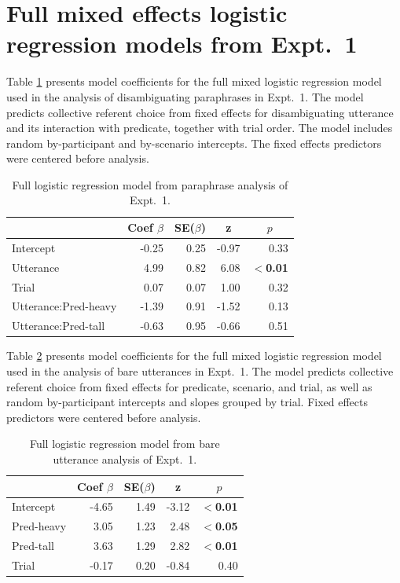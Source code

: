 \documentclass[linguex]{sp}
\begin{document}
\appendix

\section{Full mixed effects logistic regression models from Expt.~1}\label{expt1results}


Table \ref{expt1analysis1} presents model coefficients for the full mixed logistic regression model used in the analysis of disambiguating paraphrases in Expt.~1. The model predicts collective referent choice from fixed effects for disambiguating utterance and its interaction with predicate, together with trial order. The model includes random by-participant and by-scenario intercepts. The fixed effects predictors were centered before analysis.

\begin{table}[htb] 
	\centering \caption{Full logistic regression model from paraphrase analysis of Expt.~1.} \label{expt1analysis1}
\begin{tabular}{lrrrr}\toprule
	&	Coef $\beta$	&	SE($\beta$)	&	\multicolumn{1}{c}{ \textbf{z}}	&	\multicolumn{1}{c}{$p$}\\ \midrule
Intercept	&	-0.25	&	0.25	&	-0.97	&	0.33\\
Utterance	&	4.99	&	0.82	&	6.08	&	\textbf{$<$0.01}\\
Trial	&	0.07	&	0.07	&	1.00	&	0.32\\
Utterance:Pred-heavy&	-1.39	&	0.91	&	-1.52	&	0.13\\
Utterance:Pred-tall&	-0.63	&	0.95	&	-0.66	&	0.51\\
\bottomrule
\end{tabular}
\end{table}

Table \ref{expt1analysis2} presents model coefficients for the full mixed logistic regression model used in the analysis of bare utterances in Expt.~1. The model predicts collective referent choice from fixed effects for predicate, scenario, and trial, as well as random by-participant intercepts and slopes grouped by trial. Fixed effects predictors were centered before analysis.


\begin{table}[htb] 
	\centering \caption{Full logistic regression model from bare utterance analysis of Expt.~1.} \label{expt1analysis2}
	\begin{tabular}{lrrrr}\toprule
		&	Coef $\beta$	&	SE($\beta$)	&	\multicolumn{1}{c}{ \textbf{z}}	&	\multicolumn{1}{c}{$p$}\\ \midrule
		Intercept	&	-4.65	&	1.49	&	-3.12	&	\textbf{$<$0.01}\\
		Pred-heavy	&	3.05	&	1.23	&	2.48	&	\textbf{$<$0.05}\\
		Pred-tall	&	3.63	&	1.29	&	2.82	&	\textbf{$<$0.01}\\
		Trial	&	-0.17	&	0.20	&	-0.84	&	0.40\\
		\bottomrule
	\end{tabular}
\end{table}
 
\end{document}
